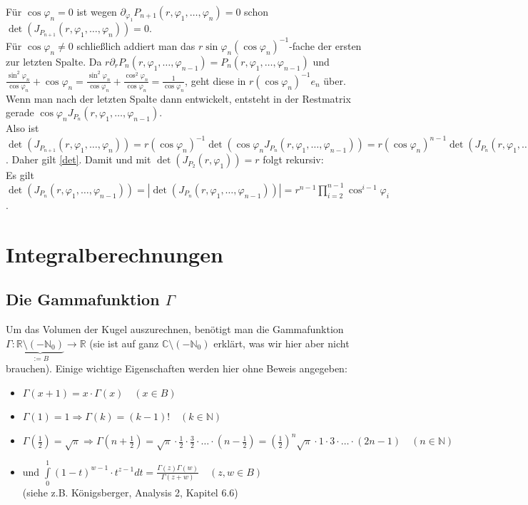\documentclass[a4paper,11pt]{scrartcl}
\newcommand{\R}{{\ensuremath{\mathbb{R}}}}
\newcommand{\N}{{\ensuremath{\mathbb{N}}}}
\newcommand{\C}{{\ensuremath{\mathbb{C}}}}
\begin{document}
Für $\cos\varphi_n=0$ ist wegen $\partial_{\varphi_1}P_{n+1}(r,\varphi_1,\ldots,\varphi_n)=0$ schon $\det(J_{P_{n+1}}(r,\varphi_1,\ldots,\varphi_n))=0$.\\
Für $\cos\varphi_n\neq 0$ schließlich addiert man das $r\sin\varphi_n(\cos\varphi_n)^{-1}$-fache der ersten zur letzten Spalte. Da $r\partial_r P_n(r,\varphi_1,\ldots,\varphi_{n-1})=P_n(r,\varphi_1,\ldots,\varphi_{n-1})$ und $\frac{\sin^2 \varphi_n}{\cos \varphi_n}+\cos \varphi_n=\frac{\sin^2 \varphi_n}{\cos \varphi_n}+\frac{\cos^2 \varphi_n}{\cos \varphi_n}=\frac{1}{\cos\varphi_n}$, geht diese in $r(\cos\varphi_n)^{-1}e_n$ über. Wenn man nach der letzten Spalte dann entwickelt, entsteht in der Restmatrix gerade $\cos\varphi_n J_{P_n}(r,\varphi_1,\ldots,\varphi_{n-1})$.\\
Also ist $\det(J_{P_{n+1}}(r,\varphi_1,\ldots,\varphi_n))=r(\cos\varphi_n)^{-1}\det(\cos\varphi_n J_{P_n}(r,\varphi_1,\ldots,\varphi_{n-1})) = r(\cos\varphi_n)^{n-1}\det(J_{P_n}(r,\varphi_1,\ldots,\varphi_{n-1}))$. Daher gilt \eqref{det}.
Damit und mit $\det(J_{P_2}(r, \varphi_1))=r$ folgt rekursiv:\\
Es gilt $\det(J_{P_n}(r,\varphi_1,\ldots,\varphi_{n-1}))=|\det(J_{P_n}(r,\varphi_1,\ldots,\varphi_{n-1}))|=r^{n-1}\prod\limits_{i=2}^{n-1}\cos^{i-1}\varphi_i$.
\section{Integralberechnungen}
\subsection{Die Gammafunktion $\Gamma$}
Um das Volumen der Kugel auszurechnen, benötigt man die Gammafunktion \\$\Gamma:\underbrace{\R\setminus(-\N_0)}_{:=B}\to\R$ (sie ist auf ganz $\C\setminus(-\N_0)$ erklärt, was wir hier aber nicht brauchen). Einige wichtige Eigenschaften werden hier ohne Beweis angegeben:
\begin{itemize}
\item $\Gamma(x+1)=x\cdot\Gamma(x) \quad (x\in B)$
\item $\Gamma(1)=1\Rightarrow\Gamma(k)=(k-1)!\quad (k\in\N)$
\item $\Gamma(\frac{1}{2})=\sqrt{\pi}\Rightarrow\Gamma(n+\frac{1}{2})=\sqrt{\pi}\cdot\frac{1}{2}\cdot\frac{3}{2}\cdot\ldots\cdot (n-\frac{1}{2})=\left(\frac{1}{2}\right)^n\sqrt{\pi}\cdot 1\cdot 3\cdot\ldots\cdot (2n-1)\quad (n\in\N)$
\item und $\int\limits_0^1 (1-t)^{w-1}\cdot t^{z-1}dt=\frac{\Gamma(z)\Gamma(w)}{\Gamma(z+w)} \quad (z,w\in B)$\\ (siehe z.B. Königsberger, Analysis 2, Kapitel 6.6)
\end{itemize}
\end{document}
